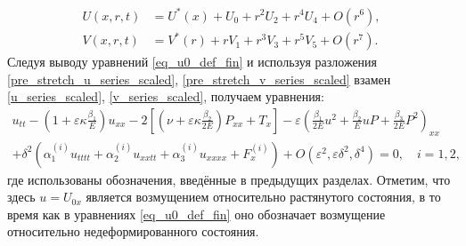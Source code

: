 \documentclass[12pt, a4paper]{report}
\begin{document}
\begin{align}
\label{pre_stretch_u_series_scaled}
U(x,r,t) &= U^*(x) + U_0 + r^2 U_2 + r^4 U_4 + O(r^6),\\
\label{pre_stretch_v_series_scaled}
V(x,r,t) &= V^*(r) + r V_1 + r^3 V_3 + r^5 V_5 + O(r^7).
\end{align}
Следуя выводу уравнений \eqref{eq_u0_def_fin} и используя разложения \eqref{pre_stretch_u_series_scaled}, \eqref{pre_stretch_v_series_scaled} взамен \eqref{u_series_scaled}, \eqref{v_series_scaled}, получаем уравнения:
\begin{equation}\label{pre_stretch_eq_u0_def_fin}
\begin{split}
u_{tt} - \left(1 + \varepsilon\kappa\frac{\beta_1}{E}\right)u_{xx} - 2 \left[\left(\nu + \varepsilon\kappa \frac{\beta_2}{2E} \right) P_{xx} + T_x\right] - \varepsilon \left(\frac{\beta_1}{2 E} u^2 + \frac{\beta_2}{E} u P + \frac{\beta_3}{2E} P^2\right)_{xx}\\
+ \delta^2 \left(\alpha_1^{(i)} u_{tttt} + \alpha_2^{(i)} u_{xxtt} + \alpha_3^{(i)} u_{xxxx} + F^{(i)}_x \right) + O(\varepsilon^2, \varepsilon\delta^2, \delta^4) = 0, \quad i = 1,2,
\end{split}
\end{equation}
где использованы обозначения, введённые в предыдущих разделах. Отметим, что здесь $u = U_{0x}$ является возмущением относительно растянутого состояния, в то время как в уравнениях \eqref{eq_u0_def_fin} оно обозначает возмущение относительно недеформированного состояния.
\end{document}

